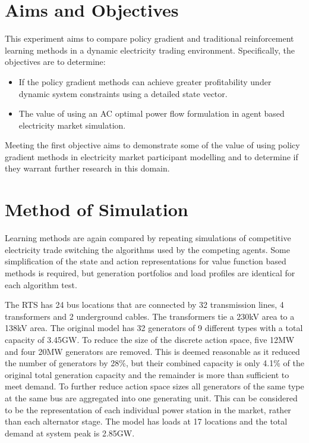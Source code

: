 \section{Aims and Objectives}
This experiment aims to compare policy gradient and traditional
reinforcement learning methods in a dynamic electricity trading environment.
Specifically, the objectives are to determine:
\begin{itemize}
  \item If the policy gradient methods can achieve greater profitability
  under dynamic system constraints using a detailed state vector.
  \item The value of using an AC optimal power flow formulation in agent based
  electricity market simulation.
\end{itemize}
Meeting the first objective aims to demonstrate some of the value of using
policy gradient methods in electricity market participant modelling and to determine
if they warrant further research in this domain.

\section{Method of Simulation}
Learning methods are again compared by repeating simulations of
competitive electricity trade switching the algorithms used by the competing
agents. Some simplification of the state and action representations for value
function based methods is required, but generation portfolios and load profiles
are identical for each algorithm test.

The RTS has 24 bus locations that are connected by 32 transmission lines, 4
transformers and 2 underground cables. The transformers tie a 230kV area to a
138kV area.  The original model has 32 generators of 9 different types with a
total capacity of 3.45GW.  To reduce the size of the discrete action space, five
12MW and four 20MW generators are removed.  This is deemed reasonable as it
reduced the number of generators by 28\%, but their combined capacity is only
4.1\% of the original total generation capacity and the remainder is
more than sufficient to meet demand.  To further reduce action space sizes all
generators of the same type at the same bus are aggregated into one generating
unit. This can be considered to be the representation of each individual power
station in the market, rather than each alternator stage.  The model has loads
at 17 locations and the total demand at system peak is 2.85GW.

